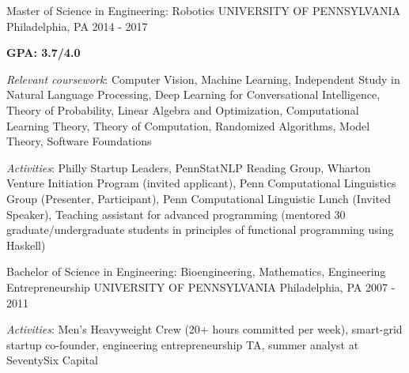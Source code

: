 \begin{cventries}
  \cventry
    {Master of Science in Engineering: Robotics}
    {UNIVERSITY OF PENNSYLVANIA}
    {Philadelphia, PA}
    {2014 - 2017}
    {
      \begin{cvitems}
        \item \textbf{GPA: 3.7/4.0}
        \item \textit{Relevant coursework}: Computer Vision, Machine Learning, Independent Study in Natural Language Processing, Deep Learning for Conversational Intelligence, Theory of Probability, Linear Algebra and Optimization, Computational Learning Theory, Theory of Computation, Randomized Algorithms, Model Theory, Software Foundations
        \item \textit{Activities}: Philly Startup Leaders, PennStatNLP Reading Group, Wharton Venture Initiation Program (invited applicant), Penn Computational Linguistics Group (Presenter, Participant),  Penn Computational Linguistic Lunch (Invited Speaker), Teaching assistant for advanced programming (mentored 30 graduate/undergraduate students in principles of functional programming using Haskell)
      \end{cvitems}
    }
  \cventry
    {Bachelor of Science in Engineering: Bioengineering, Mathematics, Engineering Entrepreneurship}
    {UNIVERSITY OF PENNSYLVANIA}
    {Philadelphia, PA}
    {2007 - 2011}
    {
      \begin{cvitems}
        \item \textit{Activities}: Men’s Heavyweight Crew (20+ hours committed per week), smart-grid startup co-founder, engineering entrepreneurship TA, summer analyst at SeventySix Capital
      \end{cvitems}
    }
\end{cventries}
